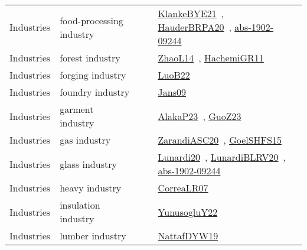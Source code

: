 {\begin{longtable}{lp{3cm}>{\raggedright\arraybackslash}p{6cm}>{\raggedright\arraybackslash}p{6cm}>{\raggedright\arraybackslash}p{8cm}}
\index{food-processing industry}\index{Industries!food-processing industry}Industries & food-processing industry &  &  & \href{../works/KlankeBYE21.pdf}{KlankeBYE21}~\cite{KlankeBYE21}, \href{../works/HauderBRPA20.pdf}{HauderBRPA20}~\cite{HauderBRPA20}, \href{../works/abs-1902-09244.pdf}{abs-1902-09244}~\cite{abs-1902-09244}\\
\index{forest industry}\index{Industries!forest industry}Industries & forest industry &  &  & \href{../works/ZhaoL14.pdf}{ZhaoL14}~\cite{ZhaoL14}, \href{../works/HachemiGR11.pdf}{HachemiGR11}~\cite{HachemiGR11}\\
\index{forging industry}\index{Industries!forging industry}Industries & forging industry &  &  & \href{../works/LuoB22.pdf}{LuoB22}~\cite{LuoB22}\\
\index{foundry industry}\index{Industries!foundry industry}Industries & foundry industry &  &  & \href{../works/Jans09.pdf}{Jans09}~\cite{Jans09}\\
\index{garment industry}\index{Industries!garment industry}Industries & garment industry &  &  & \href{../works/AlakaP23.pdf}{AlakaP23}~\cite{AlakaP23}, \href{../works/GuoZ23.pdf}{GuoZ23}~\cite{GuoZ23}\\
\index{gas industry}\index{Industries!gas industry}Industries & gas industry &  &  & \href{../works/ZarandiASC20.pdf}{ZarandiASC20}~\cite{ZarandiASC20}, \href{../works/GoelSHFS15.pdf}{GoelSHFS15}~\cite{GoelSHFS15}\\
\index{glass industry}\index{Industries!glass industry}Industries & glass industry &  &  & \href{../works/Lunardi20.pdf}{Lunardi20}~\cite{Lunardi20}, \href{../works/LunardiBLRV20.pdf}{LunardiBLRV20}~\cite{LunardiBLRV20}, \href{../works/abs-1902-09244.pdf}{abs-1902-09244}~\cite{abs-1902-09244}\\
\index{heavy industry}\index{Industries!heavy industry}Industries & heavy industry &  &  & \href{../works/CorreaLR07.pdf}{CorreaLR07}~\cite{CorreaLR07}\\
\index{insulation industry}\index{Industries!insulation industry}Industries & insulation industry &  &  & \href{../works/YunusogluY22.pdf}{YunusogluY22}~\cite{YunusogluY22}\\
\index{lumber industry}\index{Industries!lumber industry}Industries & lumber industry &  &  & \href{../works/NattafDYW19.pdf}{NattafDYW19}~\cite{NattafDYW19}\\

\end{longtable}}
